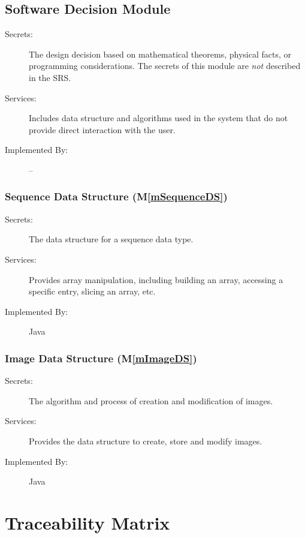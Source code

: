 \documentclass[12pt, titlepage]{article}
\newcommand{\mref}[1]{M\ref{#1}}
\begin{document}
\subsection{Software Decision Module}

\begin{description}
\item[Secrets:] The design decision based on mathematical theorems, physical
  facts, or programming considerations. The secrets of this module are
  \emph{not} described in the SRS.
\item[Services:] Includes data structure and algorithms used in the system that
  do not provide direct interaction with the user. 
\item[Implemented By:] --
\end{description}

\subsubsection{Sequence Data Structure (\mref{mSequenceDS})}

\begin{description}
\item[Secrets:]The data structure for a sequence data type.
\item[Services:]Provides array manipulation, including building an array,
accessing a specific entry, slicing an array, etc.
\item[Implemented By:] Java
\end{description}

\subsubsection{Image Data Structure (\mref{mImageDS})}

\begin{description}
\item[Secrets:]The algorithm and process of creation and modification of
images.\item[Services:]Provides the data structure to create, store and modify
images.
\item[Implemented By:] Java
\end{description}

\section{Traceability Matrix} \label{SecTM}
\end{document}
